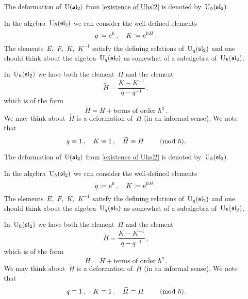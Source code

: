 \documentclass[a4paper, 11pt, oneside]{scrartcl}
\begin{document}
\begin{definition}
  The deformation of~$\operatorname{U}(\mathfrak{sl}_2)$ from \cref{existence of Uhsl2} is denoted by~$\operatorname{U}_{\hbar}(\mathfrak{sl}_2)$.
\end{definition}

\begin{remark}
  In the algebra~$\operatorname{U}_{\hbar}(\mathfrak{sl}_2)$ we can consider the well-defined elements
  \[
    q \coloneqq \mathrm{e}^{\hbar} \,,
    \quad
    K \coloneqq \mathrm{e}^{\hbar H} \,.
  \]
  The elements~$E$,~$F$,~$K$,~$K^{-1}$ satisfy the defining relations of~$\operatorname{U}_q(\mathfrak{sl}_2)$ and one should think about the algebra~$\operatorname{U}_q(\mathfrak{sl}_2)$ as somewhat of a subalgebra of~$\operatorname{U}_{\hbar}(\mathfrak{sl}_2)$.

  In~$\operatorname{U}_{\hbar}(\mathfrak{sl}_2)$ we have both the element~$H$ and the element
  \[
    \widetilde{H}
    =
    \frac{K - K^{-1}}{q - q^{-1}} \,,
  \]
  which is of the form
  \[
    \widetilde{H}
    =
    H + \text{terms of order~$\hbar^2$} \,.
  \]
  We may think about~$\widetilde{H}$ is a deformation of~$H$ (in an informal sense).
  We note that
  \[
    q \equiv 1 \,,
    \quad
    K \equiv 1 \,,
    \quad
    \widetilde{H} \equiv H
    \qquad
    \ (\mathrm{mod}\ \hbar).
  \]
\end{remark}

\begin{definition}
  The deformation of~$\operatorname{U}(\mathfrak{sl}_2)$ from \cref{existence of Uhsl2} is denoted by~$\operatorname{U}_{\hbar}(\mathfrak{sl}_2)$.
\end{definition}

\begin{remark}
  In the algebra~$\operatorname{U}_{\hbar}(\mathfrak{sl}_2)$ we can consider the well-defined elements
  \[
    q \coloneqq \mathrm{e}^{\hbar} \,,
    \quad
    K \coloneqq \mathrm{e}^{\hbar H} \,.
  \]
  The elements~$E$,~$F$,~$K$,~$K^{-1}$ satisfy the defining relations of~$\operatorname{U}_q(\mathfrak{sl}_2)$ and one should think about the algebra~$\operatorname{U}_q(\mathfrak{sl}_2)$ as somewhat of a subalgebra of~$\operatorname{U}_{\hbar}(\mathfrak{sl}_2)$.

  In~$\operatorname{U}_{\hbar}(\mathfrak{sl}_2)$ we have both the element~$H$ and the element
  \[
    \widetilde{H}
    =
    \frac{K - K^{-1}}{q - q^{-1}} \,,
  \]
  which is of the form
  \[
    \widetilde{H}
    =
    H + \text{terms of order~$\hbar^2$} \,.
  \]
  We may think about~$\widetilde{H}$ is a deformation of~$H$ (in an informal sense).
  We note that
  \[
    q \equiv 1 \,,
    \quad
    K \equiv 1 \,,
    \quad
    \widetilde{H} \equiv H
    \qquad
    \ (\mathrm{mod}\ \hbar).
  \]
\end{remark}
\end{document}
